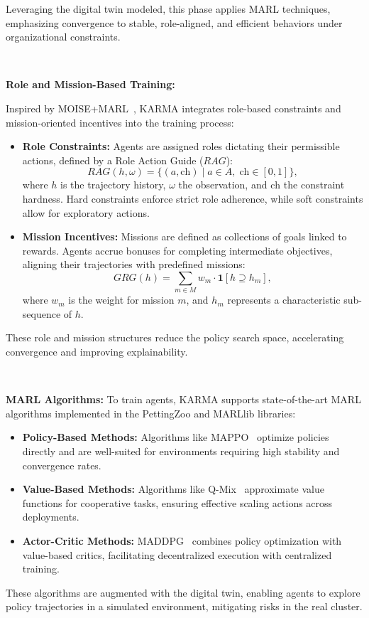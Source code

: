 \documentclass[conference]{IEEEtran}
\begin{document}
Leveraging the digital twin modeled, this phase applies MARL techniques, emphasizing convergence to stable, role-aligned, and efficient behaviors under organizational constraints.


\

\noindent\textbf{Role and Mission-Based Training:} 

Inspired by MOISE+MARL~\cite{MOISEMARL2025}, KARMA integrates role-based constraints and mission-oriented incentives into the training process:
\begin{itemize}
    \item \textbf{Role Constraints:} Agents are assigned roles dictating their permissible actions, defined by a Role Action Guide ($RAG$):
    \[
    RAG(h, \omega) = \{(a, \text{ch}) \;|\; a \in A, \; \text{ch} \in [0,1]\},
    \]
    where $h$ is the trajectory history, $\omega$ the observation, and $\text{ch}$ the constraint hardness. Hard constraints enforce strict role adherence, while soft constraints allow for exploratory actions.
    \item \textbf{Mission Incentives:} Missions are defined as collections of goals linked to rewards. Agents accrue bonuses for completing intermediate objectives, aligning their trajectories with predefined missions:
    \[
    GRG(h) = \sum_{m \in M} w_m \cdot \mathbf{1}[h \supseteq h_m],
    \]
    where $w_m$ is the weight for mission $m$, and $h_m$ represents a characteristic sub-sequence of $h$.
\end{itemize}
These role and mission structures reduce the policy search space, accelerating convergence and improving explainability.

\

\noindent\textbf{MARL Algorithms:} 
To train agents, KARMA supports state-of-the-art MARL algorithms implemented in the PettingZoo and MARLlib libraries:
\begin{itemize}
    \item \textbf{Policy-Based Methods:} Algorithms like MAPPO~\cite{MAPPO2021} optimize policies directly and are well-suited for environments requiring high stability and convergence rates.
    \item \textbf{Value-Based Methods:} Algorithms like Q-Mix~\cite{QMIX2018} approximate value functions for cooperative tasks, ensuring effective scaling actions across deployments.
    \item \textbf{Actor-Critic Methods:} MADDPG~\cite{MADDPG2017} combines policy optimization with value-based critics, facilitating decentralized execution with centralized training.
\end{itemize}
These algorithms are augmented with the digital twin, enabling agents to explore policy trajectories in a simulated environment, mitigating risks in the real cluster.
\end{document}
